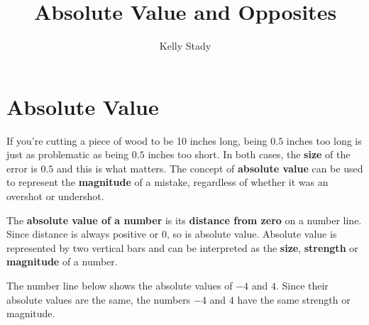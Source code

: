 \documentclass{ximera}[font=12pt]
\title{Absolute Value and Opposites}   %
\author{Kelly Stady}
\begin{document}
   

\begin{abstract}

    
\end{abstract}


\maketitle

\label{xim:AbsValue}


\section*{Absolute Value}

If you're cutting a piece of wood to be 10 inches long, being $0.5$ inches too long is just as problematic as being $0.5$ inches too short. In 
both cases, the \textbf{size} of the error is $0.5$ and this is what matters.  The concept of \textbf{absolute value} can be used to represent the \textbf{magnitude} of a mistake, regardless 
of whether it was an overshot or undershot.

The \textbf{absolute value of a number} is its \textbf{distance from zero} on a number line.  Since distance is always positive or 0, so is 
absolute value.  Absolute value is represented by two vertical bars and can be interpreted as the \textbf{size}, \textbf{strength} or 
\textbf{magnitude} of a number.

The number line below shows the absolute values of $-4$ and $4.$  Since their absolute values are the same, the numbers $-4$ and $4$ have the same strength or magnitude.
\end{document}
